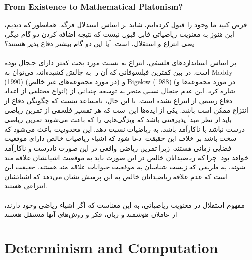 \documentclass[10pt,a4paper]{article}
\begin{document}
                    \subsubsection{From Existence to Mathematical Platonism?}
فرض کنید ما وجود را قبول کرده‌ایم، شاید بر اساس استدلال فرگه. همانطور که دیدیم، این هنوز به معنویت ریاضیاتی قابل قبول نیست که نتیجه اضافه کردن دو گام دیگر، یعنی انتزاع و استقلال، است. آیا این دو گام بیشتر دفاع پذیر هستند؟
                        \\
                        \\
بر اساس استانداردهای فلسفی، انتزاع به نسبت مورد بحث کمتر دارای جنجال بوده است. در بین کمترین فیلسوفانی که آن را به چالش کشیده‌اند، می‌توان به Maddy (1990) (در مورد مجموعه‌های غیر خالص) و Bigelow (1988) (در مورد مجموعه‌ها و انواع مختلفی از اعداد) اشاره کرد. این عدم جنجال نسبی منجر به توسعه چندانی از دفاع رسمی از انتزاع نشده است. با این حال، نامساعد نیست که چگونگی دفاع از انتزاع ممکن است باشد. یکی از ایده‌ها این است که هر تفسیر فلسفی از تمرین ریاضی باید از نظر مبدأ پذیرفتنی باشد که ویژگی‌هایی را که باعث می‌شوند تمرین ریاضی درست نباشد یا ناکارآمد باشد، به ریاضیات نسبت دهد. این محدودیت باعث می‌شود که سخت باشد بر خلاف این حقیقت ادعا شود که اشیاء ریاضیات خالص دارای موقعیت فضایی-زمانی هستند، زیرا تمرین ریاضی واقعی در این صورت نادرست و ناکارآمد خواهد بود، چرا که ریاضیدانان خالص در این صورت باید به موقعیت اشیائشان علاقه مند شوند، به طریقی که زیست شناسان به موقعیت حیوانات علاقه مند هستند. حقیقت این است که عدم علاقه ریاضیدانان خالص به این پرسش نشان می‌دهد که اشیائشان انتزاعی هستند.
                        \\
                        \\
مفهوم استقلال در معنویت ریاضیاتی، به این معناست که اگر اشیاء ریاضی وجود دارند، از عاملان هوشمند و زبان، فکر و روش‌های آنها مستقل هستند
        \section{Determinism and Computation}
\end{document}
